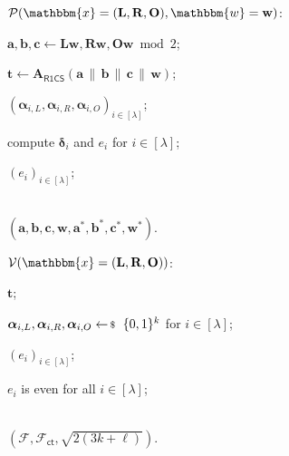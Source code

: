 \documentclass[../../book.tex]{subfiles}
\begin{document}
\begin{algoproto}[H]
    \small
    \centering
    \begin{mdframed}[linecolor=black, linewidth=1pt,
                     skipabove=10pt, skipbelow=10pt,
                     innerleftmargin=5pt, innerrightmargin=5pt]
        \begin{minipage}[t]{0.5\linewidth}
            \colorbox{oc-blue-1}{$\mathcal{P}(\mathbbm{x} = (\mathbf{L}, \mathbf{R}, \mathbf{O}), \mathbbm{w} = \mathbf{w})$:}
            \begin{algoen}
                \item $\mathbf{a}, \mathbf{b}, \mathbf{c} \gets \mathbf{L}\mathbf{w}, \mathbf{R}\mathbf{w}, \mathbf{O}\mathbf{w} \bmod 2$;
                \item {} $\mathbf{t} \gets \mathbf{A}_{\mathsf{R1CS}}(\mathbf{a}\,\|\,\mathbf{b}\,\|\,\mathbf{c}\,\|\,\mathbf{w})$;
                \item {} $(\boldsymbol{\alpha}_{i,L}, \boldsymbol{\alpha}_{i,R}, \boldsymbol{\alpha}_{i,O})_{i \in [\lambda]}$;
                \item compute $\boldsymbol{\delta}_i$ and $e_i$ for $i \in [\lambda]$;
                \item {} $(e_i)_{i \in [\lambda]}$;
                \item {} \\  $(\mathbf{a}, \mathbf{b}, \mathbf{c}, \mathbf{w}, \mathbf{a}^{\ast}, \mathbf{b}^{\ast}, \mathbf{c}^{\ast}, \mathbf{w}^{\ast})$.
            \end{algoen}
        \end{minipage}
        \hfill
        \begin{minipage}[t]{0.46\linewidth}
            \colorbox{oc-blue-1}{$\mathcal{V}(\mathbbm{x} = (\mathbf{L}, \mathbf{R}, \mathbf{O}))$:}
            \begin{algoen}
                \item {} $\mathbf{t}$;
                \item {} $\boldsymbol{\alpha}_{i,L}, \boldsymbol{\alpha}_{i,R}, \boldsymbol{\alpha}_{i,O} \leftarrowS \{0,1\}^k$ for $i \in [\lambda]$;
                \item {} $(e_i)_{i \in [\lambda]}$;
                \item {} $e_i$ is even for all $i \in [\lambda]$;
                \item {} \\  $(\mathcal{F}, \mathcal{F}_{\mathsf{ct}}, \sqrt{2(3k+\ell)})$.

\end{algoen}
\end{minipage}
\end{mdframed}
\end{algoproto}
\end{document}
